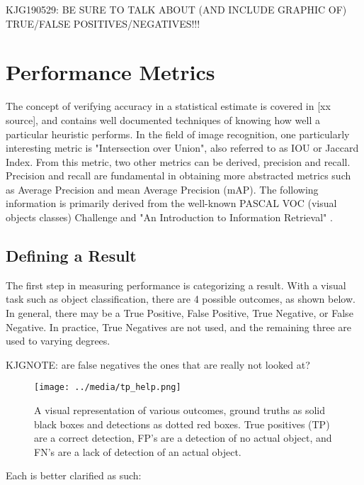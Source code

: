 

KJG190529: BE SURE TO TALK ABOUT (AND INCLUDE GRAPHIC OF) TRUE/FALSE POSITIVES/NEGATIVES!!!

\section{Performance Metrics}
The concept of verifying accuracy in a statistical estimate is covered in [xx source], and contains well documented techniques of knowing how well a particular heuristic performs. In the field of image recognition, one particularly interesting metric is "Intersection over Union", also referred to as IOU or Jaccard Index. From this metric, two other metrics can be derived, precision and recall. Precision and recall are fundamental in obtaining more abstracted metrics such as Average Precision and mean Average Precision (mAP). The following information is primarily derived from the well-known PASCAL VOC (visual objects classes) Challenge \cite{everingham_pascal_2010} and "An Introduction to Information Retrieval" \cite{Manning:2008:IIR:1394399}.

\subsection{Defining a Result}
The first step in measuring performance is categorizing a result. With a visual task such as object classification, there are 4 possible outcomes, as shown below. In general, there may be a True Positive, False Positive, True Negative, or False Negative. In practice, True Negatives are not used, and the remaining three are used to varying degrees.

KJGNOTE: are false negatives the ones that are really not looked at? 

\begin{figure}[h] %
	\centering
	\texttt{[image: ../media/tp\_help.png]}
	\caption{A visual representation of various outcomes, ground truths as solid black boxes and detections as dotted red boxes. True positives (TP) are a correct detection, FP's are a detection of no actual object, and FN's are a lack of detection of an actual object.}
	\label{tp_help} %
\end{figure}

Each is better clarified as such:





